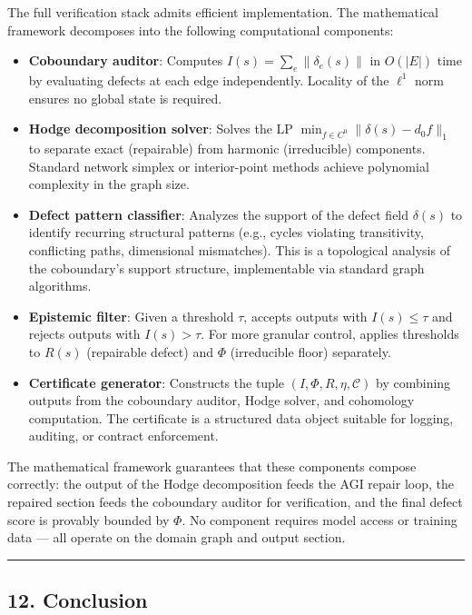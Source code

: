 \documentclass[
]{article}
\begin{document}
The full verification stack admits efficient implementation. The
mathematical framework decomposes into the following computational
components:

\begin{itemize}
\item
  \textbf{Coboundary auditor}: Computes
  \(I(s) = \sum_e \|\delta_e(s)\|\) in \(O(|E|)\) time by evaluating
  defects at each edge independently. Locality of the \(\ell^1\) norm
  ensures no global state is required.
\item
  \textbf{Hodge decomposition solver}: Solves the LP
  \(\min_{f \in C^0} \|\delta(s) - d_0 f\|_1\) to separate exact
  (repairable) from harmonic (irreducible) components. Standard network
  simplex or interior-point methods achieve polynomial complexity in the
  graph size.
\item
  \textbf{Defect pattern classifier}: Analyzes the support of the defect
  field \(\delta(s)\) to identify recurring structural patterns (e.g.,
  cycles violating transitivity, conflicting paths, dimensional
  mismatches). This is a topological analysis of the coboundary's
  support structure, implementable via standard graph algorithms.
\item
  \textbf{Epistemic filter}: Given a threshold \(\tau\), accepts outputs
  with \(I(s) \leq \tau\) and rejects outputs with \(I(s) > \tau\). For
  more granular control, applies thresholds to \(R(s)\) (repairable
  defect) and \(\Phi\) (irreducible floor) separately.
\item
  \textbf{Certificate generator}: Constructs the tuple
  \((I, \Phi, R, \eta, \mathcal{C})\) by combining outputs from the
  coboundary auditor, Hodge solver, and cohomology computation. The
  certificate is a structured data object suitable for logging,
  auditing, or contract enforcement.
\end{itemize}

The mathematical framework guarantees that these components compose
correctly: the output of the Hodge decomposition feeds the AGI repair
loop, the repaired section feeds the coboundary auditor for
verification, and the final defect score is provably bounded by
\(\Phi\). No component requires model access or training data --- all
operate on the domain graph and output section.

\begin{center}\rule{0.5\linewidth}{0.5pt}\end{center}

\subsection{12. Conclusion}\label{conclusion}
\end{document}
